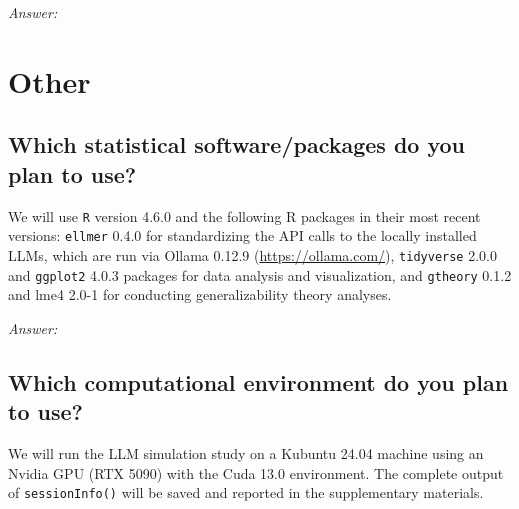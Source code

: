 \documentclass[12pt]{article}
\begin{document}
	\textit{Answer:}
	
	\section{Other}
	\subsection{Which statistical software/packages do you plan to use?}   
	
	
	\begin{examplebox}
		We will use \texttt{R} version 4.6.0 \parencite{rcoreteamLanguageEnvironmentStatistical2025} and the following R packages in their most recent versions: \texttt{ellmer} 0.4.0 \parencite{wickhamEllmerChatLarge2025} for standardizing the API calls to the locally installed LLMs, which are run via Ollama 0.12.9 (\url{https://ollama.com/}), \texttt{tidyverse} 2.0.0 \parencite{wickhamWelcomeTidyverse2019} and \texttt{ggplot2} 4.0.3 \parencite{wickhamGgplot2ElegantGraphics2016} packages for data analysis and visualization, and \texttt{gtheory} 0.1.2 \parencite{mooreGtheoryApplyGeneralizability2016} and lme4 2.0-1 \parencite{bateslme4} for conducting generalizability theory analyses.
	\end{examplebox}
	
	\textit{Answer:}
	
	\subsection{Which computational environment do you plan to use?} 
	
	
	\begin{examplebox}
		We will run the LLM simulation study on a Kubuntu 24.04 machine using an Nvidia GPU (RTX 5090) with the Cuda 13.0 environment. The complete output of \texttt{sessionInfo()} will be saved and reported in the supplementary materials.
	\end{examplebox}
	
\end{document}
